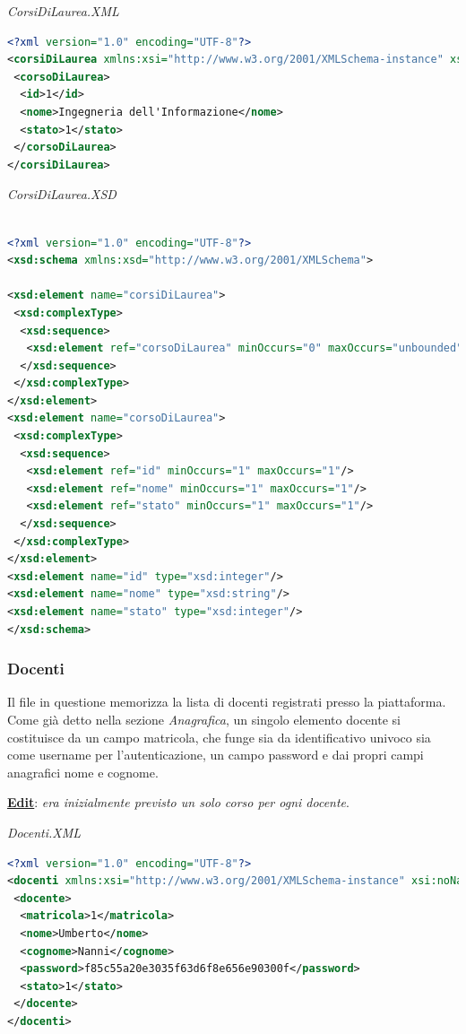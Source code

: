 \documentclass [a4paper,11pt]{book}
\begin{document}
\medskip

\emph{CorsiDiLaurea.XML}

\begin{lstlisting}[language=XML]
<?xml version="1.0" encoding="UTF-8"?>
<corsiDiLaurea xmlns:xsi="http://www.w3.org/2001/XMLSchema-instance" xsi:noNamespaceSchemaLocation="corsiDiLaurea.xsd">
 <corsoDiLaurea>
  <id>1</id>
  <nome>Ingegneria dell'Informazione</nome>
  <stato>1</stato>
 </corsoDiLaurea>
</corsiDiLaurea>
\end{lstlisting}

\medskip

\emph{CorsiDiLaurea.XSD}

\begin{lstlisting}[language=XML]

<?xml version="1.0" encoding="UTF-8"?>
<xsd:schema xmlns:xsd="http://www.w3.org/2001/XMLSchema">

<xsd:element name="corsiDiLaurea">
 <xsd:complexType>
  <xsd:sequence>
   <xsd:element ref="corsoDiLaurea" minOccurs="0" maxOccurs="unbounded" />
  </xsd:sequence>
 </xsd:complexType>
</xsd:element>
<xsd:element name="corsoDiLaurea">
 <xsd:complexType>
  <xsd:sequence>
   <xsd:element ref="id" minOccurs="1" maxOccurs="1"/>
   <xsd:element ref="nome" minOccurs="1" maxOccurs="1"/>
   <xsd:element ref="stato" minOccurs="1" maxOccurs="1"/>
  </xsd:sequence>
 </xsd:complexType>
</xsd:element>
<xsd:element name="id" type="xsd:integer"/>
<xsd:element name="nome" type="xsd:string"/>
<xsd:element name="stato" type="xsd:integer"/>
</xsd:schema>
\end{lstlisting}

\medskip

\subsubsection{Docenti}	

Il file in questione memorizza la lista di docenti registrati presso la piattaforma. Come già detto nella sezione \emph{Anagrafica}, un singolo elemento docente si costituisce da un campo matricola, che funge sia da identificativo univoco sia come username per l'autenticazione, un campo password e dai propri campi anagrafici nome e cognome.

\textbf{\underline{Edit}}: \emph{era inizialmente previsto un solo corso per ogni docente}.

\medskip

\emph{Docenti.XML}

\begin{lstlisting}[language=XML]
<?xml version="1.0" encoding="UTF-8"?>
<docenti xmlns:xsi="http://www.w3.org/2001/XMLSchema-instance" xsi:noNamespaceSchemaLocation="docenti.xsd">
 <docente>
  <matricola>1</matricola>
  <nome>Umberto</nome>
  <cognome>Nanni</cognome>
  <password>f85c55a20e3035f63d6f8e656e90300f</password>
  <stato>1</stato>
 </docente>
</docenti>
\end{lstlisting}
\end{document}
